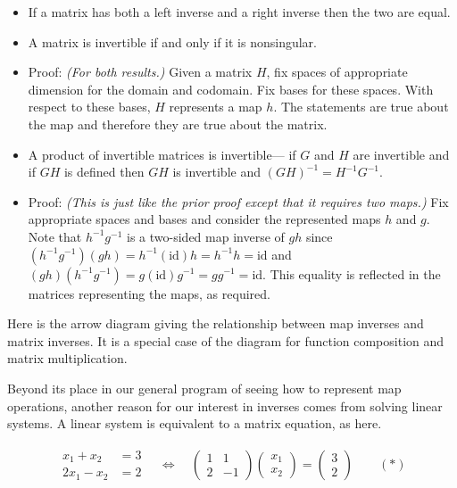 \begin{itemize}
    \item If a matrix has both a left inverse and a right inverse then the two are equal.
    \item A matrix is invertible if and only if it is nonsingular.
    \item Proof: \textit{(For both results.)} Given a matrix $H$, fix spaces of appropriate dimension for the domain and codomain. Fix bases for these spaces. With respect to these bases, $H$ represents a map $h$. The statements are true about the map and therefore they are true about the matrix.
    \item A product of invertible matrices is invertible--- if $G$ and $H$ are invertible and if $GH$ is defined then $GH$ is invertible and $(GH)^{-1}=H^{-1}G^{-1}$.
    \item Proof: \textit{(This is just like the prior proof except that it requires two maps.)} Fix appropriate spaces and bases and consider the represented maps $h$ and $g$. Note that $h^{-1}g^{-1}$ is a two-sided map inverse of $gh$ since $(h^{-1}g^{-1})(gh) = h^{-1}(\text{id})h = h^{-1}h =\text{id}$ and $(gh)(h^{-1}g^{-1}) = g(\text{id})g^{-1} = gg^{-1} = \text{id}$. This equality is reflected in the matrices representing the maps, as required.
\end{itemize}

Here is the arrow diagram giving the relationship between map inverses and matrix
inverses. It is a special case of the diagram for function composition and matrix
multiplication.






Beyond its place in our general program of seeing how to represent map operations, another
reason for our interest in inverses comes from solving linear systems. A linear system is
equivalent to a matrix equation, as here.



\[
\begin{aligned}
\begin{aligned}
x_1 + x_2 &= 3 \\
2x_1 - x_2 &= 2
\end{aligned}
\quad \Longleftrightarrow \quad
\begin{pmatrix}
1 & 1 \\
2 & -1
\end{pmatrix}
\begin{pmatrix}
x_1 \\
x_2
\end{pmatrix}
=
\begin{pmatrix}
3 \\
2
\end{pmatrix}
\quad\quad (\ast)
\end{aligned}
\]

